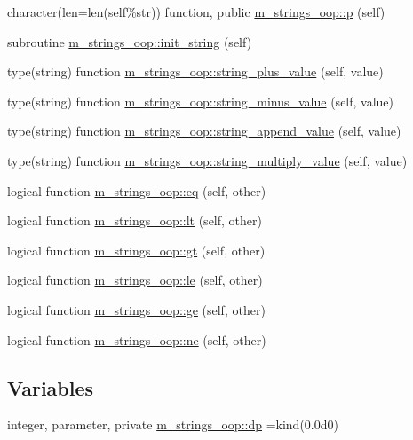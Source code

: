 \begin{DoxyCompactItemize}
\item 
character(len=len(self\%str)) function, public \mbox{\hyperlink{namespacem__strings__oop_a456e651940e317c7bc885d95458c7fcb}{m\+\_\+strings\+\_\+oop\+::p}} (self)
\item 
subroutine \mbox{\hyperlink{namespacem__strings__oop_a1510c1de10cb182598ce6a399a734be0}{m\+\_\+strings\+\_\+oop\+::init\+\_\+string}} (self)
\item 
type(string) function \mbox{\hyperlink{namespacem__strings__oop_abf27744e539317dac81d6ed1fb736059}{m\+\_\+strings\+\_\+oop\+::string\+\_\+plus\+\_\+value}} (self, value)
\item 
type(string) function \mbox{\hyperlink{namespacem__strings__oop_a0ec84db43ac789bfc02f46f933a3fc9f}{m\+\_\+strings\+\_\+oop\+::string\+\_\+minus\+\_\+value}} (self, value)
\item 
type(string) function \mbox{\hyperlink{namespacem__strings__oop_a64192a93804fcb61ca59725245ee85c2}{m\+\_\+strings\+\_\+oop\+::string\+\_\+append\+\_\+value}} (self, value)
\item 
type(string) function \mbox{\hyperlink{namespacem__strings__oop_a9624f1e09be383f993e7c0e94b230deb}{m\+\_\+strings\+\_\+oop\+::string\+\_\+multiply\+\_\+value}} (self, value)
\item 
logical function \mbox{\hyperlink{namespacem__strings__oop_a2e5c8d9117609e553db07a1eba18b1fa}{m\+\_\+strings\+\_\+oop\+::eq}} (self, other)
\item 
logical function \mbox{\hyperlink{namespacem__strings__oop_a332288f9bebc563e12671b514512eb30}{m\+\_\+strings\+\_\+oop\+::lt}} (self, other)
\item 
logical function \mbox{\hyperlink{namespacem__strings__oop_a25beb184587d7c9fc0a3fd846d4ce187}{m\+\_\+strings\+\_\+oop\+::gt}} (self, other)
\item 
logical function \mbox{\hyperlink{namespacem__strings__oop_a103e7c1fab92a1c4cbfff87ec8cd1e23}{m\+\_\+strings\+\_\+oop\+::le}} (self, other)
\item 
logical function \mbox{\hyperlink{namespacem__strings__oop_a2d31ec44898046ba97aebc0de32de19a}{m\+\_\+strings\+\_\+oop\+::ge}} (self, other)
\item 
logical function \mbox{\hyperlink{namespacem__strings__oop_aa424e1eccc45bb143172d6e212f8e408}{m\+\_\+strings\+\_\+oop\+::ne}} (self, other)
\end{DoxyCompactItemize}
\subsection*{Variables}
\begin{DoxyCompactItemize}
\item 
integer, parameter, private \mbox{\hyperlink{namespacem__strings__oop_aff89e0d0502f39fedc4f8a9cf793fdba}{m\+\_\+strings\+\_\+oop\+::dp}} =kind(0.\+0d0)
\end{DoxyCompactItemize}
